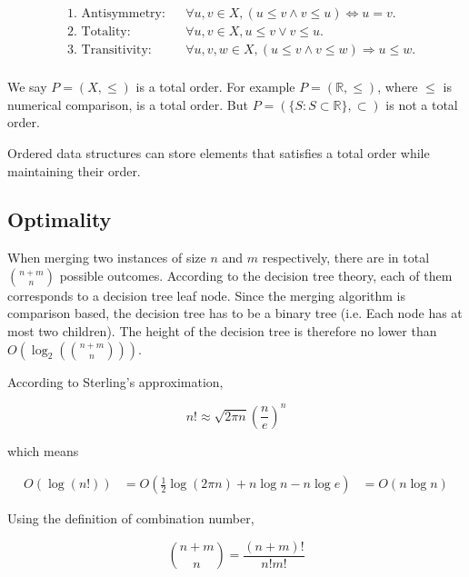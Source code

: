 \documentclass[12pt]{article}
\begin{document}
\begin{align*}
&\text{1. Antisymmetry:} && \forall u, v \in X, (u \le v \land v \le u) \Leftrightarrow u = v. \\
&\text{2. Totality:} && \forall u, v \in X, u \le v \lor v \le u. \\
&\text{3. Transitivity:} && \forall u, v, w \in X, (u \le v \land v \le w) \Rightarrow u \le w.\\
\end{align*}

We say $P = (X, \le)$ is a total order. For example $P = (\mathbb{R}, \le)$, where $\le$ is numerical comparison, is a total order. But $P = (\{S: S\subset \mathbb{R}\}, \subset)$ is not a total order.

Ordered data structures can store elements that satisfies a total order while maintaining their order. 


\subsection{Optimality}
 
When merging two instances of size $n$ and $m$ respectively, there are in total $\binom{n+m}{n}$ possible outcomes. According to the decision tree theory, each of them corresponds to a decision tree leaf node. Since the merging algorithm is comparison based, the decision tree has to be a binary tree (i.e. Each node has at most two children). The height of the decision tree is therefore no lower than $O(\log_2({\binom{n+m}{n}}))$.

According to Sterling's approximation, 

\begin{equation}
    n!\approx \sqrt{2\pi n}(\frac{n}{e})^n
\end{equation}

which means

\begin{equation}
    \begin{aligned}
        O(\log(n!)) &= O(\frac{1}{2}\log(2\pi n) + n\log n - n\log e )
                    &= O(n\log n)
    \end{aligned}
\end{equation}

Using the definition of combination number, 

\begin{equation}
    \binom{n+m}{n} = \frac{(n+m)!}{n!m!}
\end{equation}
\end{document}
